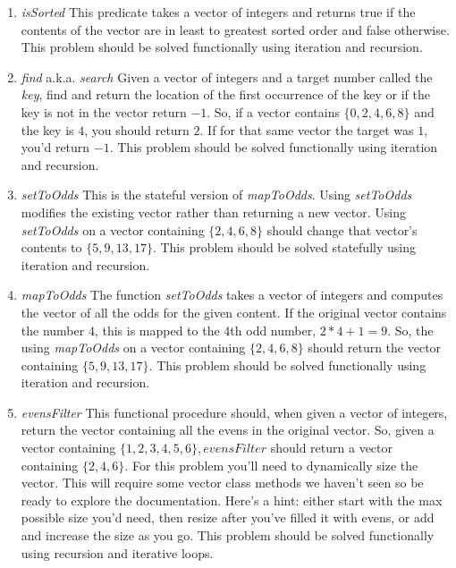 \documentclass[]{tufte-handout}
\begin{document}
\begin{enumerate}
\item \textit{isSorted} \newline
This predicate takes a vector of integers and returns true if the contents of the vector are in least to greatest sorted order and false otherwise. This problem should be solved functionally using iteration and recursion.  

\item \textit{find} a.k.a. \textit{search} \newline
Given a vector of integers and a target number called the \textit{key}, find and return the location of the first occurrence of the key or if the key is not in the vector return $-1$. So, if a vector contains $\{0,2,4,6,8\}$ and the key is $4$, you should return $2$. If for that same vector the target was $1$, you'd return $-1$.  This problem should be solved functionally using iteration and recursion.  

\item \textit{setToOdds} \newline
This is the stateful version of \textit{mapToOdds}. Using \textit{setToOdds} modifies the existing vector rather than returning a new vector. Using \textit{setToOdds} on  a vector containing $\{2,4,6,8\}$ should change that vector's contents to $\{5,9,13,17\}$.  This problem should be solved statefully using iteration and recursion.  

\item \textit{mapToOdds} \newline
The function \textit{setToOdds} takes a vector of integers and computes the vector of all the odds for the given content. If the original vector contains the number $4$, this is mapped to the $4$th odd number, $2*4+1 = 9$.  So, the using \textit{mapToOdds} on a vector containing $\{2,4,6,8\}$ should return the vector containing $\{5,9,13,17\}$.  This problem should be solved functionally using iteration and recursion.  

\item \textit{evensFilter} \newline
This functional procedure should, when given a vector of integers, return the vector containing all the evens in the original vector. So, given a vector containing $\{1,2,3,4,5,6\}, \textit{evensFilter}$ should return a vector containing $\{2,4,6\}$. For this problem you'll need to dynamically size the vector. This will require some vector class methods we haven't seen so be ready to explore the documentation. Here's a hint: either start with the max possible size you'd need, then resize after you've filled it with evens, or add and increase the size as you go.  This problem should be solved functionally using recursion and iterative loops.  


\end{enumerate}
\end{document}

